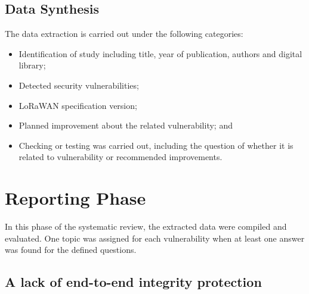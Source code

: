 \documentclass[manuscript,screen,review=false]{acmart}
\begin{document}
\subsection{Data Synthesis}

The data extraction is carried out under the following categories:
\begin{itemize}
\item Identification of study including title, year of publication, authors and digital library;
\item Detected security vulnerabilities;
\item LoRaWAN specification version;
\item Planned improvement about the related vulnerability; and 
\item Checking or testing was carried out, including the question of whether it is related to vulnerability or recommended improvements.
\end{itemize}

\section{Reporting Phase}

In this phase of the systematic review, the extracted data were compiled and evaluated.  One topic was assigned for each vulnerability when at least one answer was found for the defined questions.

\subsection{A lack of end-to-end integrity protection}
\end{document}
